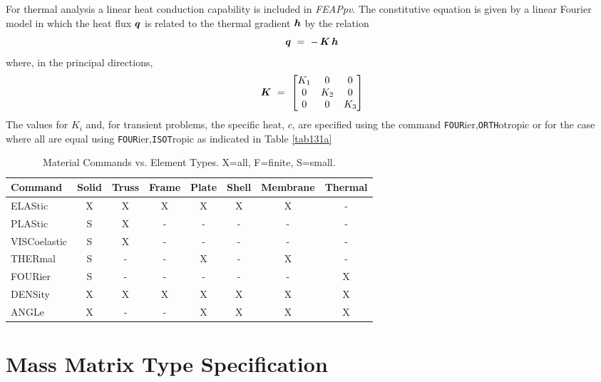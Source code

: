 For thermal analysis a linear heat conduction capability is included in
{\sl FEAPpv}.  The constitutive equation is given by a linear Fourier
model in which the heat flux $\boldsymbol{q}$ is related to the thermal gradient $\boldsymbol{h}$
by the relation
\begin{equation}
\boldsymbol{q} ~=~ - \, \boldsymbol{K} \, \boldsymbol{h}
\end{equation}
where, in the principal directions,
\begin{equation}
\boldsymbol{K} ~=~ \left[ \begin{matrix}
K_1 & 0 & 0 \\
0 & K_2 & 0 \\
0 & 0 & K_3 \\
\end{matrix} \right]
\end{equation}
The values for $K_i$ and, for transient problems, the specific heat, $c$,
are specified using the command {\tt FOUR}\-ier,{\tt ORTH}o\-trop\-ic
or for the case where all are equal using {\tt FOUR}\-ier,{\tt ISOT}rop\-ic
as indicated in Table \ref{tab131a}

\begin{table}[ht!]
\begin{center}
\begin{tabular}{| l | c | c | c | c | c | c | c |} \hline
Command & Solid & Truss & Frame & Plate & Shell & Membrane & Thermal \\ \hline
ELAStic       & X & X & X & X & X & X & - \\
PLAStic       & S & X & - & - & - & - & - \\
VISCoelastic  & S & X & - & - & - & - & - \\
THERmal       & S & - & - & X & - & X & - \\
FOURier       & S & - & - & - & - & - & X \\
DENSity       & X & X & X & X & X & X & X \\
ANGLe         & X & - & - & X & X & X & X \\ \hline
\end{tabular}
\end{center}
\caption{Material Commands vs. Element Types. X=all, F=finite, S=small.}
\label{tab131b}
\end{table}

\section{Mass Matrix Type Specification}
\label{masstype}

